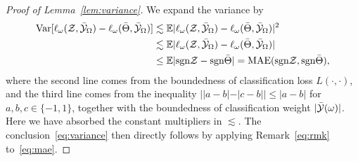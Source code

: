 \documentclass[11pt]{article}
\theoremstyle{plain}
\theoremstyle{definition}
\def\sign{\textup{sgn}}
\begin{document}
\begin{proof}[Proof of Lemma~\ref{lem:variance}]
We expand the variance by
\begin{align}\label{eq:mae}
\text{Var}[\ell_\omega(\tZ,\bar \tY_\Omega)-\ell_\omega(\bar \Theta, \bar \tY_\Omega)] &\lesssim \mathbb{E}|\ell_\omega(\tZ,\bar \tY_\Omega)-\ell_\omega(\bar \Theta, \bar \tY_\Omega)|^2\notag \\
&\lesssim \mathbb{E}|\ell_\omega(\tZ,\bar \tY_\Omega)-\ell_\omega(\bar \Theta, \bar \tY_\Omega)|\notag \\
&\leq \mathbb{E}|\sign\tZ-\sign \bar \Theta| = \textup{MAE}(\sign\tZ, \sign \bar \Theta),
\end{align}
where the second line comes from the boundedness of classification loss $L(\cdot ,\cdot)$, and the third line comes from the inequality $||a-b|-|c-b||\leq |a-b|$ for $a,b,c\in\{-1,1\}$, together with the boundedness of classification weight $|\bar{\mathcal{Y}}(\omega)|$. Here we have absorbed the constant multipliers in $\lesssim$. The conclusion~\eqref{eq:variance} then directly follows by applying Remark~\ref{eq:rmk} to~\eqref{eq:mae}.
\end{proof}
\end{document}
